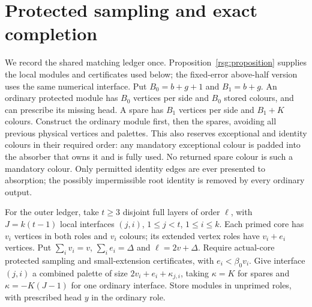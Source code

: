 \section{Protected sampling and exact completion}
\label{sg:sec:outer}\label{gaq:section}
We record the shared matching ledger once. Proposition~\ref{rsg:proposition}
supplies the local modules and certificates used below; the fixed-error
above-half version uses the same numerical interface. Put $B_0=b+g+1$ and $B_1=b+g$. An ordinary protected module has $B_0$ vertices per side and $B_0$ stored colours, and can prescribe its missing head. A spare has $B_1$ vertices per side and $B_1+K$ colours. Construct the ordinary module first, then the spares, avoiding all
previous physical vertices and palettes. This also reserves exceptional
and identity colours in their required order: any mandatory exceptional
colour is padded into the absorber that owns it and is fully used.
No returned spare colour is such a mandatory colour. Only permitted
identity edges are ever presented to absorption; the possibly
impermissible root identity is removed by every ordinary output.

For the outer ledger, take $t\ge3$ disjoint full layers of order $\ell$, with $J=k(t-1)$ local interfaces $(j,i)$, $1\le{}j<t$, $1\le{}i\le{}k$. Each primed core has $v_i$ vertices in both roles and $v_i$ colours; its extended vertex roles have $v_i+e_i$ vertices. Put $\sum_iv_i=v$, $\sum_ie_i=\Delta$ and $\ell=2v+\Delta$. Require actual-core protected sampling and small-extension certificates, with $e_i<\beta_0v_i$. Give interface $(j,i)$ a combined palette of size $2v_i+e_i+\kappa_{j,i}$, taking $\kappa=K$ for spares and $\kappa=-K(J-1)$ for one ordinary interface. Store modules in unprimed roles, with prescribed head $y$ in the ordinary role.

